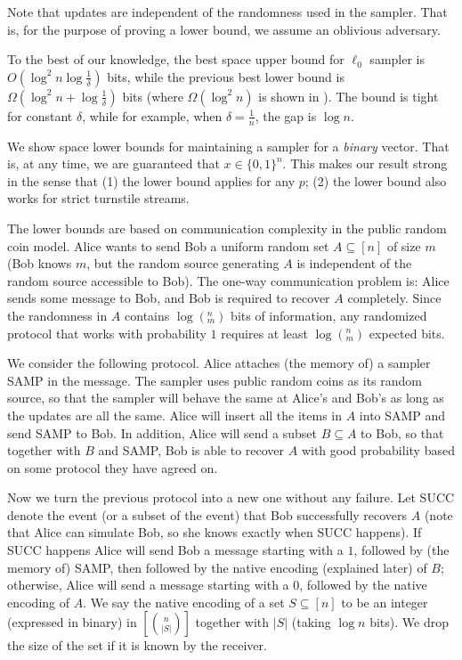 \documentclass[10pt]{article}
\newcommand{\samp}{\textsf{SAMP}\xspace}
\newcommand{\success}{\textsf{SUCC}\xspace}
\begin{document}
Note that updates are independent of the randomness used in the sampler. That is, for the purpose of proving a lower bound, we assume an oblivious adversary. 

To the best of our knowledge, the best space upper bound for $\ell_0$ sampler is $O(\log^2 n \log \frac{1}{\delta})$ bits, while the previous best lower bound is $\Omega(\log^2 n +\log\frac{1}{\delta})$ bits (where $\Omega(\log^2 n)$ is shown in \cite{jowhari2011tight}). The bound is tight for constant $\delta$, while for example, when $\delta=\frac{1}{n}$, the gap is $\log n$. 

We show space lower bounds for maintaining a sampler for a {\em binary} vector. That is, at any time, we are guaranteed that $x\in \{0,1\}^n$. This makes our result strong in the sense that (1) the lower bound applies for any $p$; (2) the lower bound also works for strict turnstile streams.

The lower bounds are based on communication complexity in the public random coin model. Alice wants to send Bob a uniform random set $A\subseteq [n]$ of size $m$ (Bob knows $m$, but the random source generating $A$ is independent of the random source accessible to Bob). The one-way communication problem is: Alice sends some message to Bob, and Bob is required to recover $A$ completely. Since the randomness in $A$ contains $\log (^n_m)$ bits of information, any randomized protocol that works with probability $1$ requires at least $\log (^n_m)$ expected bits. 

We consider the following protocol. Alice attaches (the memory of) a sampler \samp in the message. The sampler uses public random coins as its random source, so that the sampler will behave the same at Alice's and Bob's as long as the updates are all the same. Alice will insert all the items in $A$ into \samp and send \samp to Bob. In addition, Alice will send a subset $B\subseteq A$ to Bob, so that together with $B$ and \samp, Bob is able to recover $A$ with good probability based on some protocol they have agreed on. 
 
Now we turn the previous protocol into a new one without any failure. Let \success denote the event (or a subset of the event) that Bob successfully recovers $A$ (note that Alice can simulate Bob, so she knows exactly when \success happens). If \success happens Alice will send Bob a message starting with a $1$, followed by (the memory of) \samp, then followed by the native encoding (explained later) of $B$; otherwise, Alice will send a message starting with a $0$, followed by the native encoding of $A$. We say the native encoding of a set $S\subseteq [n]$ to be an integer (expressed in binary) in $[{n \choose |S|}]$ together with $|S|$ (taking $\log n$ bits). We drop the size of the set if it is known by the receiver.
\end{document}
